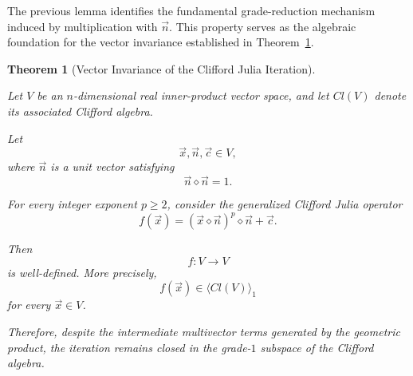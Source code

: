 \documentclass{amsart}
\newtheorem{theorem}{Theorem}
\theoremstyle{plain}
\numberwithin{equation}{section}
\begin{document}
The previous lemma identifies the fundamental grade-reduction
mechanism induced by multiplication with $\vec n$. This property
serves as the algebraic foundation for the vector invariance
established in Theorem~\ref{my-Thm}.

\begin{theorem}[Vector Invariance of the Clifford Julia Iteration]
\label{my-Thm}

Let $V$ be an $n$-dimensional real inner-product vector space,
and let $Cl(V)$ denote its associated Clifford algebra.

Let
\[
\vec x,\vec n,\vec c\in V,
\]
where $\vec n$ is a unit vector satisfying
\[
\vec n\diamond\vec n=1.
\]

For every integer exponent $p\ge2$, consider the generalized
Clifford Julia operator
\[
f(\vec x)
=
(\vec x\diamond\vec n)^p\diamond\vec n+\vec c.
\]

Then
\[
f:V\to V
\]
is well-defined. More precisely,
\[
f(\vec x)\in \langle Cl(V)\rangle_1
\]
for every $\vec x\in V$.

Therefore, despite the intermediate multivector terms generated
by the geometric product, the iteration remains closed in the
grade-$1$ subspace of the Clifford algebra.

\end{theorem}
\end{document}
